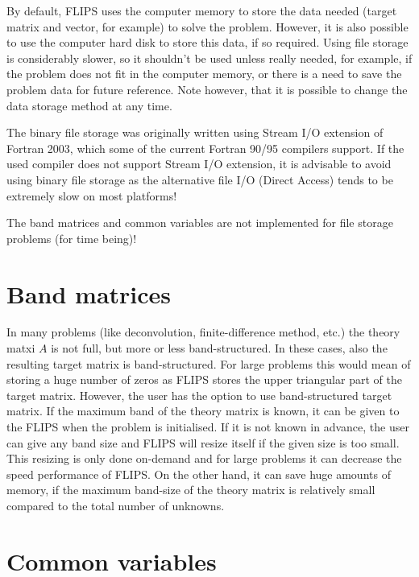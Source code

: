 \documentclass[a4paper,twoside]{refrep}
\begin{document}
By default, FLIPS uses the computer memory to store the data needed (target matrix and vector, for example) to solve the problem. However, it is also possible to use the computer hard disk to store this data, if so required. Using file storage is considerably slower, so it shouldn't be used unless really needed, for example, if the problem does not fit in the computer memory, or there is a need to save the problem data for future reference. Note however, that it is possible to change the data storage method at any time.

\attention The binary file storage was originally written using Stream I/O extension of Fortran 2003, which some of the current Fortran 90/95 compilers support. If the used compiler does not support Stream I/O extension, it is advisable to avoid using binary file storage as the alternative file I/O (Direct Access) tends to be extremely slow on most platforms!

\attention The band matrices and common variables are not implemented for file storage problems (for time being)!

\section{Band matrices}\label{band}

In many problems (like deconvolution, finite-difference method, etc.) the theory matxi $A$ is not full, but more or less band-structured. In these cases, also the resulting target matrix is band-structured. For large problems this would mean of storing a huge number of zeros as FLIPS stores the upper triangular part of the target matrix. However, the user has the option to use band-structured target matrix. If the maximum band of the theory matrix is known, it can be given to the FLIPS when the problem is initialised. If it is not known in advance, the user can give any band size and FLIPS will resize itself if the given size is too small. This resizing is only done on-demand and for large problems it can decrease the speed performance of FLIPS. On the other hand, it can save huge amounts of memory, if the maximum band-size of the theory matrix is relatively small compared to the total number of unknowns.

\section{Common variables}\label{cv}
\end{document}
